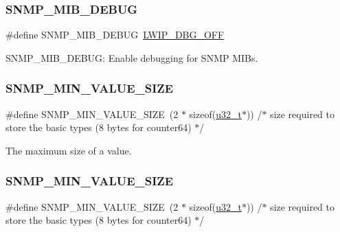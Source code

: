 \subsubsection{\texorpdfstring{S\+N\+M\+P\+\_\+\+M\+I\+B\+\_\+\+D\+E\+B\+UG}{SNMP\_MIB\_DEBUG}\hspace{0.1cm}{\footnotesize\ttfamily [2/2]}}
{\footnotesize\ttfamily \#define S\+N\+M\+P\+\_\+\+M\+I\+B\+\_\+\+D\+E\+B\+UG~\hyperlink{group__debugging__levels_gadab1cdc3f45939a3a5c9a3d7e04987e1}{L\+W\+I\+P\+\_\+\+D\+B\+G\+\_\+\+O\+FF}}

S\+N\+M\+P\+\_\+\+M\+I\+B\+\_\+\+D\+E\+B\+UG\+: Enable debugging for S\+N\+MP M\+I\+Bs. \mbox{\label{group__snmp__opts_gac815d0dbe576299546ac612e7eaf3f90}} 
\subsubsection{\texorpdfstring{S\+N\+M\+P\+\_\+\+M\+I\+N\+\_\+\+V\+A\+L\+U\+E\+\_\+\+S\+I\+ZE}{SNMP\_MIN\_VALUE\_SIZE}\hspace{0.1cm}{\footnotesize\ttfamily [1/2]}}
{\footnotesize\ttfamily \#define S\+N\+M\+P\+\_\+\+M\+I\+N\+\_\+\+V\+A\+L\+U\+E\+\_\+\+S\+I\+ZE~(2 $\ast$ sizeof(\hyperlink{group__compiler__abstraction_ga4c14294869aceba3ef9d4c0c302d0f33}{u32\+\_\+t}$\ast$)) /$\ast$ size required to store the basic types (8 bytes for counter64) $\ast$/}

The maximum size of a value. \mbox{\label{group__snmp__opts_gac815d0dbe576299546ac612e7eaf3f90}} 
\subsubsection{\texorpdfstring{S\+N\+M\+P\+\_\+\+M\+I\+N\+\_\+\+V\+A\+L\+U\+E\+\_\+\+S\+I\+ZE}{SNMP\_MIN\_VALUE\_SIZE}\hspace{0.1cm}{\footnotesize\ttfamily [2/2]}}
{\footnotesize\ttfamily \#define S\+N\+M\+P\+\_\+\+M\+I\+N\+\_\+\+V\+A\+L\+U\+E\+\_\+\+S\+I\+ZE~(2 $\ast$ sizeof(\hyperlink{group__compiler__abstraction_ga4c14294869aceba3ef9d4c0c302d0f33}{u32\+\_\+t}$\ast$)) /$\ast$ size required to store the basic types (8 bytes for counter64) $\ast$/}


